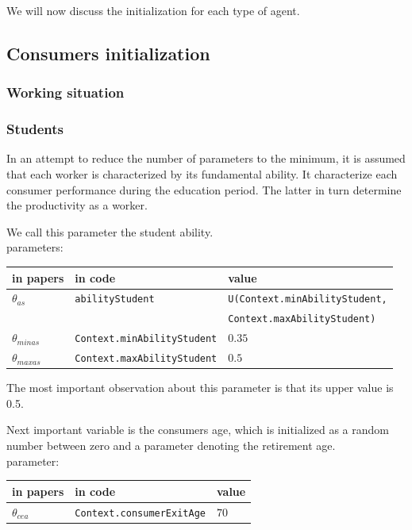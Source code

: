 \documentclass{book}
\begin{document}
We will now discuss the initialization for each type of agent.

\subsection{Consumers initialization}

\subsubsection{Working situation}


\subsubsection*{Students}

In an attempt to reduce the number of parameters to the minimum, it is assumed that each worker is characterized by its fundamental ability. It characterize each consumer performance during the education period. The latter in turn determine the productivity as a worker.

We call this parameter the student ability.\\
parameters:\\
\begin{tabular}{l l l}
	\hline
	in papers& in code&value\\
	\hline
	\hline
$\theta_{as}$&\verb+abilityStudent+&\verb+U(Context.minAbilityStudent,+\\
& &\verb+Context.maxAbilityStudent)+\\
 $\theta_{minas}$&\verb+Context.minAbilityStudent+&$0.35$\\
 $\theta_{maxas}$&\verb+Context.maxAbilityStudent+&$0.5$\\
	\hline
\end{tabular}

\vskip5mm
The most important observation about this parameter is that its upper value is 0.5.

Next important variable is the consumers age, which is initialized as a random number between zero and a parameter denoting the retirement age.\\
parameter:\\
\begin{tabular}{l l l}
	\hline
	in papers& in code&value\\
	\hline
	\hline
 $\theta_{cea}$&\verb+Context.consumerExitAge+&$70$\\
	\hline
\end{tabular}
\end{document}
